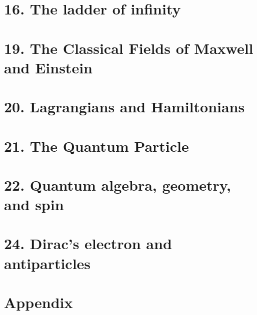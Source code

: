\documentclass[a4paper,11pt]{article}
\begin{document}
\newpage
\section{16. The ladder of infinity}


\newpage
\section{19. The Classical Fields of Maxwell and Einstein}


\newpage
\section{20. Lagrangians and Hamiltonians}


\newpage
\section{21. The Quantum Particle}


\newpage
\section{22. Quantum algebra, geometry, and spin}


\newpage
\section{24. Dirac's electron and antiparticles}


\newpage
\section{Appendix}

\end{document}
